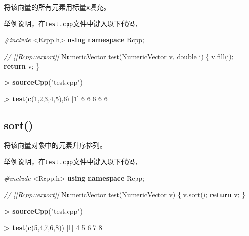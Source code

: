 \documentclass[]{ctexbook}
\newenvironment{Shaded}{\begin{snugshade}}{\end{snugshade}}
\newcommand{\KeywordTok}[1]{\textcolor[rgb]{0.13,0.29,0.53}{\textbf{#1}}}
\newcommand{\DataTypeTok}[1]{\textcolor[rgb]{0.13,0.29,0.53}{#1}}
\newcommand{\DecValTok}[1]{\textcolor[rgb]{0.00,0.00,0.81}{#1}}
\newcommand{\StringTok}[1]{\textcolor[rgb]{0.31,0.60,0.02}{#1}}
\newcommand{\ImportTok}[1]{#1}
\newcommand{\CommentTok}[1]{\textcolor[rgb]{0.56,0.35,0.01}{\textit{#1}}}
\newcommand{\ControlFlowTok}[1]{\textcolor[rgb]{0.13,0.29,0.53}{\textbf{#1}}}
\newcommand{\OperatorTok}[1]{\textcolor[rgb]{0.81,0.36,0.00}{\textbf{#1}}}
\newcommand{\PreprocessorTok}[1]{\textcolor[rgb]{0.56,0.35,0.01}{\textit{#1}}}
\newcommand{\NormalTok}[1]{#1}
\begin{document}
将该向量的所有元素用标量\texttt{x}填充。

举例说明，在\texttt{test.cpp}文件中键入以下代码，

\begin{Shaded}
\begin{Highlighting}[]
\PreprocessorTok{#include }\ImportTok{<Rcpp.h>}
\KeywordTok{using} \KeywordTok{namespace}\NormalTok{ Rcpp;}

\CommentTok{// [[Rcpp::export]]}
\NormalTok{NumericVector test(NumericVector v, }\DataTypeTok{double}\NormalTok{ i) \{}
\NormalTok{  v.fill(i);}
  \ControlFlowTok{return}\NormalTok{ v;}
\NormalTok{\}}
\end{Highlighting}
\end{Shaded}

\begin{Shaded}
\begin{Highlighting}[]
\OperatorTok{>}\StringTok{ }\KeywordTok{sourceCpp}\NormalTok{(}\StringTok{"test.cpp"}\NormalTok{)}

\OperatorTok{>}\StringTok{ }\KeywordTok{test}\NormalTok{(}\KeywordTok{c}\NormalTok{(}\DecValTok{1}\NormalTok{,}\DecValTok{2}\NormalTok{,}\DecValTok{3}\NormalTok{,}\DecValTok{4}\NormalTok{,}\DecValTok{5}\NormalTok{),}\DecValTok{6}\NormalTok{)}
\NormalTok{[}\DecValTok{1}\NormalTok{] }\DecValTok{6} \DecValTok{6} \DecValTok{6} \DecValTok{6} \DecValTok{6}
\end{Highlighting}
\end{Shaded}

\subsection{sort()}\label{sort}

将该向量对象中的元素升序排列。

举例说明，在\texttt{test.cpp}文件中键入以下代码，

\begin{Shaded}
\begin{Highlighting}[]
\PreprocessorTok{#include }\ImportTok{<Rcpp.h>}
\KeywordTok{using} \KeywordTok{namespace}\NormalTok{ Rcpp;}

\CommentTok{// [[Rcpp::export]]}
\NormalTok{NumericVector test(NumericVector v) \{}
\NormalTok{  v.sort();}
  \ControlFlowTok{return}\NormalTok{ v;}
\NormalTok{\}}
\end{Highlighting}
\end{Shaded}

\begin{Shaded}
\begin{Highlighting}[]
\OperatorTok{>}\StringTok{ }\KeywordTok{sourceCpp}\NormalTok{(}\StringTok{"test.cpp"}\NormalTok{)}

\OperatorTok{>}\StringTok{ }\KeywordTok{test}\NormalTok{(}\KeywordTok{c}\NormalTok{(}\DecValTok{5}\NormalTok{,}\DecValTok{4}\NormalTok{,}\DecValTok{7}\NormalTok{,}\DecValTok{6}\NormalTok{,}\DecValTok{8}\NormalTok{))}
\NormalTok{[}\DecValTok{1}\NormalTok{] }\DecValTok{4} \DecValTok{5} \DecValTok{6} \DecValTok{7} \DecValTok{8}
\end{Highlighting}
\end{Shaded}
\end{document}
